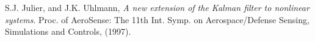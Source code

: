\documentclass[twoside]{article}
\begin{document}
\begin{multicols}{2}
\begin{thebibliography}{2}
S.J. Julier, and J.K. Uhlmann, \emph{A new extension of the Kalman filter to nonlinear systems}. Proc. of AeroSense: The 11th Int. Symp. on Aerospace/Defense Sensing, Simulations and Controls, (1997).

\end{thebibliography}


\end{multicols}
\end{document}
